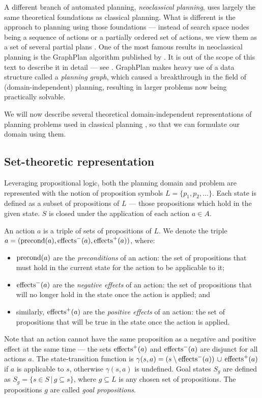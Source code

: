 A different branch of automated planning, \textit{neoclassical planning},
uses largely the same theoretical foundations as classical 
planning. What is different is the approach to planning using those foundations
--- instead of search space nodes being a sequence of actions or a partially ordered
set of actions, we view them as a set of several partial plans
\citep[Part~II]{Ghallab2004}.
One of the most famous results in neoclassical planning is the GraphPlan algorithm
published by \citet{Blum1997}. It is out of the scope of this text to describe it in detail
--- see \citet[Section~6.3]{Ghallab2004}.
GraphPlan makes heavy use of a data structure called a \textit{planning graph},
which caused a breakthrough in the field of (domain-independent) planning,
resulting in larger problems now being practically solvable.

We will now describe several theoretical domain-independent representations
of planning problems used in classical planning \citep[Chapter~2]{Ghallab2004},
so that we can formulate our domain using them.

\subsection{Set-theoretic representation}

Leveraging propositional logic, both the planning domain and problem
are represented with the notion
of proposition symbols $L = \{p_1, p_2, \ldots\}$.
Each state is defined as a subset of propositions of $L$ --- those propositions
which hold in the given state. $S$ is closed under the application of each
action $a \in A$.

An action $a$
is a triple of sets of propositions of $L$.
We denote the triple $a = (\operatorname{\textrm{precond}}(a), \operatorname{\textrm{effects}}^-(a), \operatorname{\textrm{effects}}^+(a))$, where:
\begin{itemize}
\item $\operatorname{\textrm{precond}}(a)$ are the \textit{preconditions} of an action: the set of
propositions that must hold in the current state for the action to be applicable to it;
\item $\operatorname{\textrm{effects}}^-(a)$ are the \textit{negative effects} of an action:
the set of propositions
that will no longer hold in the state once the action is applied; and
\item similarly, $\operatorname{\textrm{effects}}^+(a)$ are the \textit{positive effects} of an action:
the set of propositions that will be true in the state once the action is applied.
\end{itemize}
Note that an action cannot have the same proposition as a negative and positive effect at the same time --- the sets $\operatorname{\textrm{effects}}^+(a)$ and $\operatorname{\textrm{effects}}^-(a)$ are disjunct for all actions $a$.
The state-transition function is $\gamma(s, a) = (s \setminus \operatorname{\textrm{effects}}^-(a)) \,\cup\,
\operatorname{\textrm{effects}}^+(a)$ if $a$ is applicable to $s$,
otherwise $\gamma(s, a)$ is undefined. Goal states $S_g$ are defined as
$S_g = \{s \in S \,|\, g \subseteq s\}$, where
$g \subseteq L$ is any chosen set of propositions. The propositions $g$ are called
\textit{goal propositions}.

